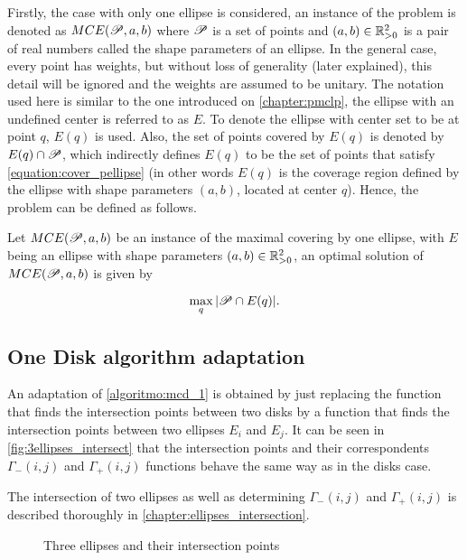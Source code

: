 Firstly, the case with only one ellipse is considered, an instance of the problem is denoted as $MCE(\mathscr{P}, a, b)$ where $\mathscr{P}$ is a set of points and $(a,b) \in \mathbb{R}_{>0}^2$ is a pair of real numbers called the shape parameters of an ellipse. 
In the general case, every point has weights, but without loss of generality (later explained), this detail will be ignored and the weights are assumed to be unitary.
The notation used here is similar to the one introduced on \autoref{chapter:pmclp}, the ellipse with an undefined center is referred to as $E$. To denote the ellipse with center set to be at point $q$, $E(q)$ is used. Also, the set of points covered by $E(q)$ is denoted by $E(q) \cap \mathscr{P}$, which indirectly defines $E(q)$ to be the set of points that satisfy \autoref{equation:cover_pellipse} (in other words $E(q)$ is the coverage region defined by the ellipse with shape parameters $(a,b)$, located at center $q$). Hence, the problem can be defined as follows.

\begin{definicao}
Let $MCE(\mathscr{P}, a, b)$ be an instance of the maximal covering by one ellipse, with $E$ being an ellipse with shape parameters $(a,b) \in \mathbb{R}_{>0}^2$, an optimal solution of $MCE(\mathscr{P}, a, b)$ is given by

\begin{equation}
    \max_q |\mathscr{P} \cap E(q)|.
\end{equation}
\end{definicao}

\subsection{One Disk algorithm adaptation}

An adaptation of \autoref{algoritmo:mcd_1} is obtained by just replacing the function that finds the intersection points between two disks by a function that finds the intersection points between two ellipses $E_i$ and $E_j$.
It can be seen in \autoref{fig:3ellipses_intersect} that the intersection points and their correspondents $\Gamma_-(i,j)$ and $\Gamma_+(i,j)$ functions behave the same way as in the disks case.

The intersection of two ellipses as well as determining $\Gamma_-(i,j)$ and $\Gamma_+(i,j)$ is described thoroughly in \autoref{chapter:ellipses_intersection}. 


\begin{figure}[H]
\centering

    \caption{Three ellipses and their intersection points}
    
    \fautor
    \label{fig:3ellipses_intersect}
\end{figure}

